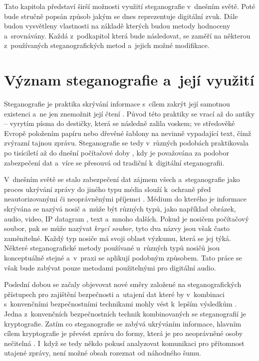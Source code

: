 Tato kapitola představí širší možnosti využití steganografie v~dnešním světě.
Poté bude stručně popsán způsob jakým se dnes reprezentuje digitální zvuk. Dále
budou vysvětleny vlastnosti na základě kterých budou metody hodnoceny
a~srovnávány. Každá z~podkapitol která bude následovat, se zaměří na některou
z~používaných steganografických metod a~jejich možné modifikace.

\section{Význam steganografie a~její využití}
\label{sec:motivation-and-uses}

Steganografie je praktika skrývání informace s~cílem zakrýt její samotnou
existenci a~ne jen znemožnit její čtení
\cite{AlSabhany2020}\cite{Anderson1998}\cite{Djebbar2012}\cite{Dutta2020}.
Původ této praktiky se vrací až do antiky -- vyrytím písma do destičky, která
se následně zalila voskem; ve středověké Evropě položením papíru nebo dřevěné
šablony na nevinně vypadající text, čímž zvýrazní tajnou zprávu. Steganografie
se tedy v~různých podobách praktikovala po tisíciletí až do dnešní počítačové
doby \cite{Anderson1998}, kdy je považována za podobor zabezpečení dat
\cite{Djebbar2012} a~více se přesouvá od tradiční k~digitální steganografii.

V~dnešním světě se stalo zabezpečení dat zájmem všech a~steganografie jako
proces ukrývání zprávy do jiného typu média slouží k~ochraně před
neautorizovanými či neoprávněnými příjemci \cite{Dutta2020}. Médium do kterého
je informace skrývána se nazývá nosič a~může být různých typů, jako například
obrázek, audio, video, IP datagram \cite{Dutta2020}, text a~mnoho dalších.
Pokud je nosičem počítačový soubor, pak se může nazývat \textit{krycí soubor},
tyto dva názvy jsou však často zaměnitelné. Každý typ nosiče má svoji oblast
výzkumu, která se jej týká. Některé steganografické metody používané u~různých
typů nosičů jsou konceptuálně stejné a~v~praxi se aplikují podobným způsobem.
Tato práce se však bude zabývat pouze metodami použitelnými pro digitální
audio.

Poslední dobou se začaly objevovat nové směry založené na steganografických
přístupech pro zajištění bezpečnosti a~utajení dat které by v~kombinaci
s~konvenčními bezpečnostními technikami mohly vést k~lepším výsledkům
\cite{Djebbar2012}. Jedna z~konvenčních bezpečnostních technik kombinovaných se
steganografií je kryptografie. Zatím co steganografie se zabývá ukrýváním
informace, hlavním cílem kryptografie je převést zprávu do formy, která je pro
neoprávněné osoby nečitelná \cite{AlSabhany2020}. I~když se tedy někdo pokusí
analyzovat komunikaci pro přítomnost utajené zprávy, není možné obsah rozeznat
od náhodného šumu.

